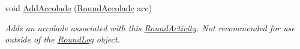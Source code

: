 \begin{DoxyCompactItemize}
\item 
\hypertarget{class_m_b_c_1_1_core_1_1_round_log_1_1_round_activity_a46fdc053d4d185227893de422d2a4ba0}{void \hyperlink{class_m_b_c_1_1_core_1_1_round_log_1_1_round_activity_a46fdc053d4d185227893de422d2a4ba0}{Add\-Accolade} (\hyperlink{class_m_b_c_1_1_core_1_1_round_log_a4060830ca7135aa755ec5b6d24aa30e6}{Round\-Accolade} acc)}\label{class_m_b_c_1_1_core_1_1_round_log_1_1_round_activity_a46fdc053d4d185227893de422d2a4ba0}

\begin{DoxyCompactList}\small\item\em Adds an accolade associated with this \hyperlink{class_m_b_c_1_1_core_1_1_round_log_1_1_round_activity}{Round\-Activity}. Not recommended for use outside of the \hyperlink{class_m_b_c_1_1_core_1_1_round_log}{Round\-Log} object.\end{DoxyCompactList}\end{DoxyCompactItemize}
